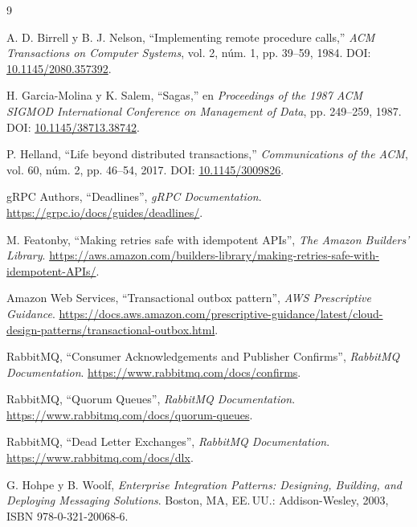 \documentclass[12pt,a4paper]{article}
\begin{document}
\begin{thebibliography}{9}

A. D. Birrell y B. J. Nelson,
``Implementing remote procedure calls,''
\textit{ACM Transactions on Computer Systems},
vol. 2, núm. 1, pp. 39--59, 1984.
DOI:
\href{https://doi.org/10.1145/2080.357392}
{10.1145/2080.357392}.

H. Garcia-Molina y K. Salem,
``Sagas,''
en \textit{Proceedings of the 1987 ACM SIGMOD
International Conference on Management of Data},
pp. 249--259, 1987.
DOI:
\href{https://doi.org/10.1145/38713.38742}
{10.1145/38713.38742}.

P. Helland,
``Life beyond distributed transactions,''
\textit{Communications of the ACM},
vol. 60, núm. 2, pp. 46--54, 2017.
DOI:
\href{https://doi.org/10.1145/3009826}
{10.1145/3009826}.

gRPC Authors,
“Deadlines”,
\textit{gRPC Documentation}.
\url{https://grpc.io/docs/guides/deadlines/}.

M. Featonby,
“Making retries safe with idempotent APIs”,
\textit{The Amazon Builders’ Library}.
\url{https://aws.amazon.com/builders-library/making-retries-safe-with-idempotent-APIs/}.

Amazon Web Services,
“Transactional outbox pattern”,
\textit{AWS Prescriptive Guidance}.
\url{https://docs.aws.amazon.com/prescriptive-guidance/latest/cloud-design-patterns/transactional-outbox.html}.


RabbitMQ,
``Consumer Acknowledgements and Publisher Confirms'',
\textit{RabbitMQ Documentation}.
\url{https://www.rabbitmq.com/docs/confirms}.

RabbitMQ,
``Quorum Queues'',
\textit{RabbitMQ Documentation}.
\url{https://www.rabbitmq.com/docs/quorum-queues}.

RabbitMQ,
``Dead Letter Exchanges'',
\textit{RabbitMQ Documentation}.
\url{https://www.rabbitmq.com/docs/dlx}.

G. Hohpe y B. Woolf,
\textit{Enterprise Integration Patterns: Designing, Building, and Deploying Messaging Solutions}.
Boston, MA, EE.\,UU.: Addison-Wesley, 2003, ISBN 978-0-321-20068-6.

\end{thebibliography}
\end{document}
